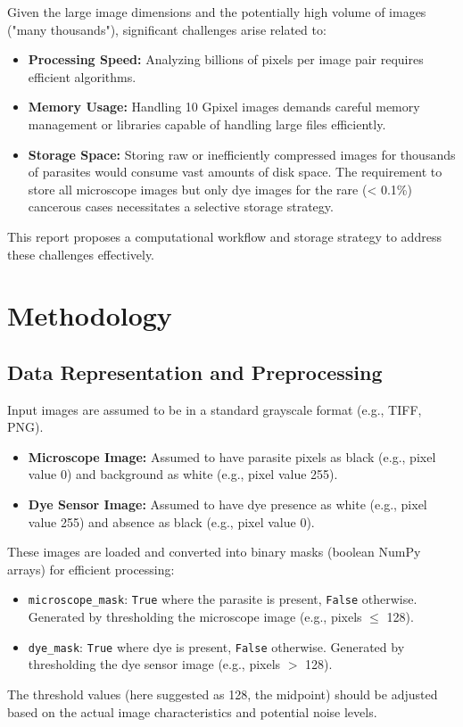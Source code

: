 \documentclass{article}
\begin{document}
Given the large image dimensions and the potentially high volume of images ("many thousands"), significant challenges arise related to:
\begin{itemize}
    \item \textbf{Processing Speed:} Analyzing billions of pixels per image pair requires efficient algorithms.
    \item \textbf{Memory Usage:} Handling 10 Gpixel images demands careful memory management or libraries capable of handling large files efficiently.
    \item \textbf{Storage Space:} Storing raw or inefficiently compressed images for thousands of parasites would consume vast amounts of disk space. The requirement to store all microscope images but only dye images for the rare (< 0.1\%) cancerous cases necessitates a selective storage strategy.
\end{itemize}
This report proposes a computational workflow and storage strategy to address these challenges effectively.

\section{Methodology}

\subsection{Data Representation and Preprocessing}
Input images are assumed to be in a standard grayscale format (e.g., TIFF, PNG).
\begin{itemize}
    \item \textbf{Microscope Image:} Assumed to have parasite pixels as black (e.g., pixel value 0) and background as white (e.g., pixel value 255).
    \item \textbf{Dye Sensor Image:} Assumed to have dye presence as white (e.g., pixel value 255) and absence as black (e.g., pixel value 0).
\end{itemize}
These images are loaded and converted into binary masks (boolean NumPy arrays) for efficient processing:
\begin{itemize}
    \item \texttt{microscope\_mask}: \texttt{True} where the parasite is present, \texttt{False} otherwise. Generated by thresholding the microscope image (e.g., pixels $\le$ 128).
    \item \texttt{dye\_mask}: \texttt{True} where dye is present, \texttt{False} otherwise. Generated by thresholding the dye sensor image (e.g., pixels $>$ 128).
\end{itemize}
The threshold values (here suggested as 128, the midpoint) should be adjusted based on the actual image characteristics and potential noise levels.
\end{document}

